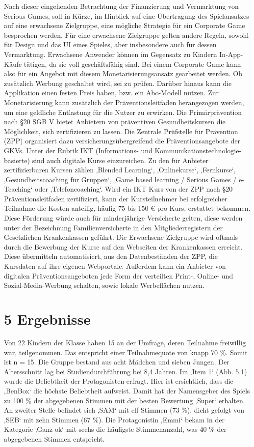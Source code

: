 \documentclass[
  a4paper,
  DIV=11,
  numbers=noendperiod,
  onecolumn,
  oneside,
  a4paper]{scrartcl}
\begin{document}
Nach dieser eingehenden Betrachtung der Finanzierung und Vermarktung von
Serious Games, soll in Kürze, im Hinblick auf eine Übertragung des
Spielansatzes auf eine erwachsene Zielgruppe, eine mögliche Strategie
für ein Corporate Game besprochen werden. Für eine erwachsene Zielgruppe
gelten andere Regeln, sowohl für Design und das UI eines Spieles, aber
insbesondere auch für dessen Vermarktung. Erwachsene Anwender können im
Gegensatz zu Kindern In-App-Käufe tätigen, da sie voll geschäftsfähig
sind. Bei einem Corporate Game kann also für ein Angebot mit diesem
Monetarisierungsansatz gearbeitet werden. Ob zusätzlich Werbung
geschaltet wird, sei zu prüfen. Darüber hinaus kann die Applikation
einen festen Preis haben, bzw. ein Abo-Modell nutzen. Zur
Monetarisierung kann zusätzlich der Präventionsleitfaden herangezogen
werden, um eine geldliche Entlastung für die Nutzer zu erwirken. Die
Primärprävention nach §20 SGB V bietet Anbietern von präventiven
Gesundheitskursen die Möglichkeit, sich zertifizieren zu lassen. Die
Zentrale Prüfstelle für Prävention (ZPP) organisiert dazu
versicherungsübergreifend die Präventionsangebote der GKVs. Unter der
Rubrik IKT (Informations- und Kommunikationstechnologie-basierte) sind
auch digitale Kurse einzureichen. Zu den für Anbieter zertifizierbaren
Kursen zählen ‚Blended Learning`, ‚Onlinekurse`, ‚Fernkurse`,
‚Gesundheitscoaching für Gruppen`, ‚Game based learning / Serious Games
/ e-Teaching` oder ‚Telefoncoaching`. Wird ein IKT Kurs von der ZPP nach
§20 Präventionsleitfaden zertifiziert, kann der Kursteilnehmer bei
erfolgreicher Teilnahme die Kosten anteilig, häufig 75 bis 150 € pro
Kurs, erstattet bekommen. Diese Förderung würde auch für minderjährige
Versicherte gelten, diese werden unter der Bezeichnung
Familienversicherte in den Mitgliederregistern der Gesetzlichen
Krankenkassen geführt. Die Erwachsene Zielgruppe wird oftmals durch die
Bewerbung der Kurse auf den Webseiten der Krankenkassen erreicht. Diese
übermitteln automatisiert, aus den Datenbeständen der ZPP, die Kursdaten
auf ihre eigenen Webportale. Außerdem kann ein Anbieter von digitalen
Präventionsangeboten jede Form der verteilten Print-, Online- und
Sozial-Media-Werbung schalten, sowie lokale Werbeflächen nutzen.

\section{5 Ergebnisse}\label{ergebnisse}

Von 22 Kindern der Klasse haben 15 an der Umfrage, deren Teilnahme
freiwillig war, teilgenommen. Das entspricht einer Teilnahmequote von
knapp 70 \%. Somit ist n = 15. Die Gruppe bestand aus acht Mädchen und
sieben Jungen. Der Altersschnitt lag bei Studiendurchführung bei 8,4
Jahren. Im ‚Item 1` (Abb. 5.1) wurde die Beliebtheit der Protagonisten
erfragt. Hier ist ersichtlich, dass die ‚BenBox` die höchste Beliebtheit
aufweist. Damit hat der Namensgeber des Spiels zu 100 \% der abgegebenen
Stimmen mit der besten Bewertung ‚Super` erhalten. An zweiter Stelle
befindet sich ‚SAM` mit elf Stimmen (73 \%), dicht gefolgt von ‚SEB` mit
zehn Stimmen (67 \%). Die Protagonistin ‚Emmi` bekam in der Kategorie
‚Ganz ok` mit sechs die häufigste Stimmenanzahl, was 40 \% der
abgegebenen Stimmen entspricht.
\end{document}

